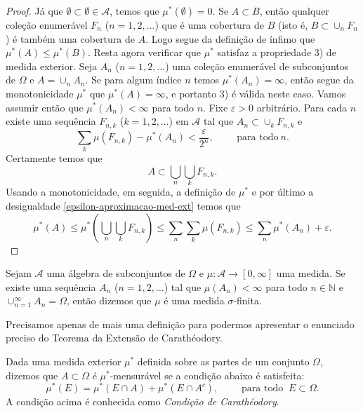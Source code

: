 \begin{proof}
Já que $\emptyset\subset \emptyset \in \mathcal{A}$, temos que $\mu^{*}(\emptyset)=0$.
Se $A\subset B$, então qualquer coleção enumerável $F_n$ ($n=1,2,\ldots$) que é uma 
cobertura de $B$ (isto é, $B\subset \cup_n F_n$) é também uma cobertura de $A$.
Logo segue da definição de ínfimo que $\mu^{*}(A)\leq \mu^{*}(B)$.
Resta agora verificar que $\mu^{*}$ satisfaz a propriedade 3) de medida exterior.
Seja $A_n$ ($n=1,2,\ldots$) uma coleção enumerável de subconjuntos de $\Omega$
e $A=\cup_n A_n$. Se para algum índice $n$ temos $\mu^{*}(A_n)=\infty$,
então segue da monotonicidade $\mu^{*}$ que $\mu^{*}(A)=\infty$, e portanto 
3) é válida neste caso. Vamos assumir então que $\mu^{*}(A_n)<\infty$ 
para todo $n$. Fixe $\varepsilon>0$ arbitrário. Para cada $n$ existe
uma sequência $F_{n,k}$ ($k=1,2,\ldots$) em $\mathcal{A}$ tal que 
$A_n\subset \cup _k F_{n,k}$ e 
\begin{equation}\label{epsilon-aproximacao-med-ext}
\sum_k \mu(F_{n,k}) -\mu^{*}(A_n) < \frac{\varepsilon}{2^n},
\qquad
\text{ para todo}\ n.
\end{equation}
Certamente temos que 
$$
A\subset \bigcup_{n}\bigcup_{k} F_{n,k}.
$$
Usando a monotonicidade, em seguida, a definição de $\mu^{*}$ e por 
último a desigualdade \eqref{epsilon-aproximacao-med-ext} temos que
$$
\mu^{*}(A)
\leq 
\mu^{*}\left( \bigcup_{n}\bigcup_{k} F_{n,k} \right)
\leq
\sum_{n}\sum_{k} \mu(F_{n,k})
\leq \sum_{n}\mu^{*}(A_n) +\varepsilon.
$$
\end{proof}
 
 

\begin{definicao}
	Sejam $\mathcal{A}$ uma álgebra de subconjuntos de $\Omega$ e 
	$\mu:\mathcal{A}\to [0,\infty]$ uma medida.
	Se existe uma sequência $A_n$ ($n=1,2,\ldots$) tal que $\mu(A_n)<\infty$ 
	para todo $n\in\mathbb{N}$ e $\cup_{n=1}^{\infty}A_n =\Omega$, então 
	dizemos que $\mu$ é uma medida $\sigma$-finita.
\end{definicao} 
 
Precisamos apenas de mais uma definição para podermos apresentar o enunciado
preciso do Teorema da Extensão de Carathéodory.




\begin{definicao}
Dada uma medida exterior $\mu^{*}$ definida sobre as partes de um conjunto $\Omega$,
dizemos que $A\subset \Omega$ é $\mu^{*}$-mensurável se a condição abaixo é satisfeita:
\begin{equation}\label{cond-caratheodory}
\mu^{*}(E) = \mu^*(E\cap A) + \mu^*(E\cap A^c),
\qquad
\text{ para todo } \ E\subset\Omega.
\end{equation}
A condição acima é conhecida como {\it Condição de Carathéodory}.
\end{definicao}




